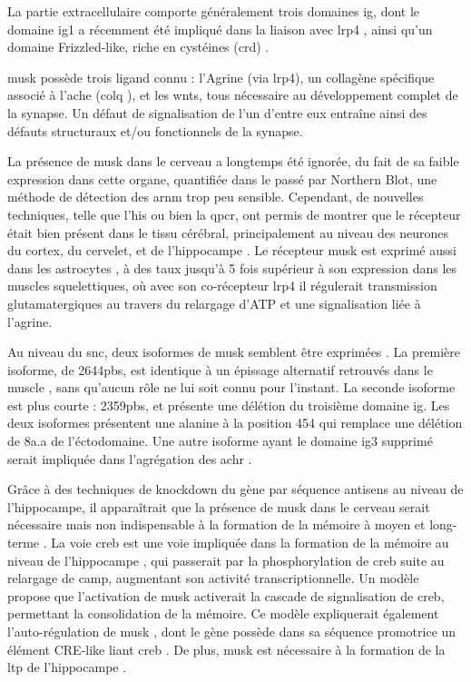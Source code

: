	La partie extracellulaire comporte généralement trois domaines \gls{ig}, dont le domaine \gls{ig}1 a récemment été impliqué dans la liaison avec \gls{lrp}4 \cite{Zhang2011}, ainsi qu'un domaine Frizzled-like, riche en cystéines (\gls{crd}) \cite{Jing2009}.
	
	\gls{musk} possède trois ligand connu : l'Agrine (via \gls{lrp}4), un collagène spécifique associé à l'\Gls{ache} (\acrshort{colq} ), et les \Glspl{wnt}, tous nécessaire au développement complet de la synapse. Un défaut de signalisation de l'un d'entre eux entraîne ainsi des défauts structuraux et/ou fonctionnels de la synapse.
	
	La présence de \gls{musk} dans le cerveau a longtemps été ignorée, du fait de sa faible expression dans cette organe, quantifiée dans le passé par Northern Blot, une méthode de détection des \acrshort{arnm} trop peu sensible. Cependant, de nouvelles techniques, telle que l'\gls{his} ou bien la \gls{qpcr}, ont permis de montrer que le récepteur était bien présent dans le tissu cérébral, principalement au niveau des neurones du cortex, du cervelet, et de l'hippocampe \cite{Garcia-Osta2006, Ksiazek2007}. Le récepteur \gls{musk} est exprimé aussi dans les astrocytes \cite{Sun2016}, à des taux jusqu'à 5 fois supérieur à son expression dans les muscles squelettiques, où avec son co-récepteur \gls{lrp}4 il régulerait transmission glutamatergiques au travers du relargage d'ATP et une signalisation liée à l'agrine.
	
	Au niveau du \gls{snc}, deux isoformes de \gls{musk} semblent être exprimées \cite{Garcia-Osta2006}. La première isoforme, de 2644pbs, est identique à un épissage alternatif retrouvés dans le muscle \cite{Valenzuela1995}, sans qu'aucun rôle ne lui soit connu pour l'instant. La seconde isoforme est plus courte : 2359pbs, et présente une délétion du troisième domaine \gls{ig}. Les deux isoformes présentent une alanine à la position 454 qui remplace une délétion de 8a.a de l'éctodomaine. Une autre isoforme ayant le domaine \gls{ig}3 supprimé serait impliquée dans l'agrégation des \gls{achr} \cite{Hesser1999}.
	
	Grâce à des techniques de knockdown du gène par séquence antisens au niveau de l'hippocampe, il apparaîtrait que la présence de \gls{musk} dans le cerveau serait nécessaire mais non indispensable à la formation de la mémoire à moyen et long-terme \cite{Garcia-Osta2006}. La voie \gls{creb} est une voie impliquée dans la formation de la mémoire au niveau de l'hippocampe \cite{Silva1998, Kandel2012,Kida2014,Ortega-Martinez2015}, qui passerait par la phosphorylation de \gls{creb} suite au relargage de \acrshort{camp}, augmentant son activité transcriptionnelle. Un modèle propose \cite{Garcia-Osta2006} que l'activation de \gls{musk} activerait la cascade de signalisation de \gls{creb}, permettant la consolidation de la mémoire. Ce modèle expliquerait également l'auto-régulation de \gls{musk} \cite{Moore2001}, dont le gène possède dans sa séquence promotrice un élément CRE-like liant \gls{creb} \cite{Kim2005}. De plus, \gls{musk} est nécessaire à la formation de la \gls{ltp} de l'hippocampe \cite{Garcia-Osta2006}.
	
